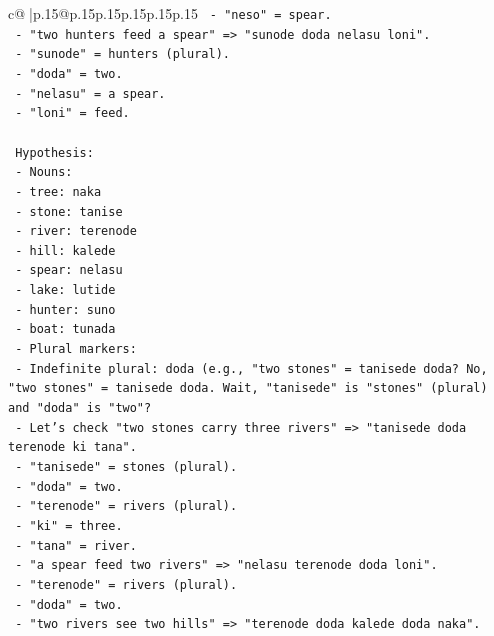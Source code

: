 \documentclass{article}
\begin{document}
{\begin{supertabular}{c@{$\;$}|p{.15\linewidth}@{}p{.15\linewidth}p{.15\linewidth}p{.15\linewidth}p{.15\linewidth}p{.15\linewidth}}
{{{\texttt{               {-} "neso" = spear.} \\
\texttt{             {-} "two hunters feed a spear" => "sunode doda nelasu loni".} \\
\texttt{               {-} "sunode" = hunters (plural).} \\
\texttt{               {-} "doda" = two.} \\
\texttt{               {-} "nelasu" = a spear.} \\
\texttt{               {-} "loni" = feed.} \\
\\ 
\texttt{   Hypothesis:} \\
\texttt{   {-} Nouns:} \\
\texttt{     {-} tree: naka} \\
\texttt{     {-} stone: tanise} \\
\texttt{     {-} river: terenode} \\
\texttt{     {-} hill: kalede} \\
\texttt{     {-} spear: nelasu} \\
\texttt{     {-} lake: lutide} \\
\texttt{     {-} hunter: suno} \\
\texttt{     {-} boat: tunada} \\
\texttt{   {-} Plural markers:} \\
\texttt{     {-} Indefinite plural: doda (e.g., "two stones" = tanisede doda? No, "two stones" = tanisede doda. Wait, "tanisede" is "stones" (plural) and "doda" is "two"?} \\
\texttt{     {-} Let's check "two stones carry three rivers" => "tanisede doda terenode ki tana".} \\
\texttt{       {-} "tanisede" = stones (plural).} \\
\texttt{       {-} "doda" = two.} \\
\texttt{       {-} "terenode" = rivers (plural).} \\
\texttt{       {-} "ki" = three.} \\
\texttt{       {-} "tana" = river.} \\
\texttt{     {-} "a spear feed two rivers" => "nelasu terenode doda loni".} \\
\texttt{       {-} "terenode" = rivers (plural).} \\
\texttt{       {-} "doda" = two.} \\
\texttt{     {-} "two rivers see two hills" => "terenode doda kalede doda naka".} \\
}}}
\end{supertabular}}
\end{document}

